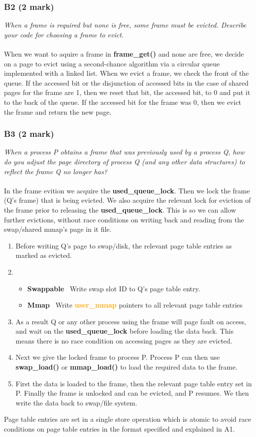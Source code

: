 \documentclass{report}
\newcommand{\question}[1]{\textit{#1} \ }
\newcommand{\bullpara}[2]{\item \textbf{#1} \ #2}
\newcommand{\fun}[1]{\textcolor{Emerald}{\textbf{#1}}}
\newcommand{\struct}[1]{\textcolor{orange}{\textbf{#1}}}
\newcommand{\var}[1]{\textcolor{RoyalPurple}{\textbf{#1}}}
\newcommand{\compitem}[1]{\begin{itemize}\setlength\itemsep{-0.1em}#1\end{itemize}}
\newcommand{\compenum}[1]{\begin{enumerate}\setlength\itemsep{-0.1em}#1\end{enumerate}}
\begin{document}
			\subsubsection*{B2 (2 mark)}
				\question{When a frame is required but none is free, some frame 
				must be evicted. Describe your code for choosing a frame to 
				evict.}
				\\
				\\ When we want to aquire a frame in \fun{frame\_get()} and none
				are free, we decide on a page to evict using a second-chance 
				algorithm via a circular queue implemented with a linked list. 
				When we evict a frame, we check the front of the queue. 
				If the accessed bit or the disjunction of accessed bits in the 
				case of shared pages for the frame are 1, then we reset that 
				bit, the accessed bit, to 0 and put it to the back of the queue.
				If the accessed bit for the frame was 0, then we evict the frame
				and return the new page.
			
			\subsubsection*{B3 (2 mark)}
				\question{When a process P obtains a frame that was previously 
				used by a process Q, how do you adjust the page directory of
				process Q (and any other data structures) to reflect the frame 
				Q no longer has?}
				\\
				\\ In the frame evition we acquire the \var{used\_queue\_lock}.
				Then we lock the frame (Q's frame) that is being evicted.
				We also acquire the relevant lock for eviction of the frame 
				prior to releasing the \var{used\_queue\_lock}. This is so we 
				can allow further evictions, without race conditions on writing 
				back and reading from the swap/shared mmap's page in it file.
				
				\compenum {
					\item Before writing Q's page to swap/disk, 
					the relevant page table entries as marked as evicted.
					\item \compitem{
						\bullpara{Swappable}
						{Write swap slot ID to Q's page table entry.}
						\bullpara{Mmap}
						{Write \struct{user\_mmap} pointers to all relevant page
						table entries}}
					\item As a result Q or any other process using the frame 
						will page fault on access, and wait on the 
						\var{used\_queue\_lock} before loading the data back.
						This means there is no race condition on accessing
						pages as they are evicted.
					\item Next we give the locked frame to process P. Process P 
						can then use \fun{swap\_load()} or \fun{mmap\_load()} to 
						load the required data to the frame. 
					\item First the data is loaded to the frame, then the 
						relevant page table entry set in P. Finally the frame
						is unlocked and can be evicted, and P resumes. We then
						write the data back to swap/file system.
				}
				Page table entries are set in a single store operation which is 
				atomic to avoid race conditions on page table entries in the 
				format specified and explained in A1.
\end{document}
